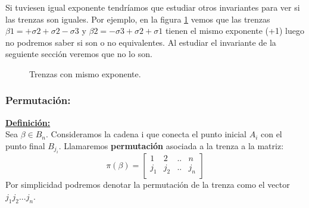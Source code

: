 \documentclass[14pt]{extarticle}
\begin{document}
Si tuviesen igual exponente tendríamos que estudiar otros invariantes para ver si las trenzas son iguales. Por ejemplo, en la figura \ref{exp3} vemos que las trenzas $\beta1 = +\sigma2+\sigma2-\sigma3$ y $\beta2 = -\sigma3+\sigma2+\sigma1$ tienen el mismo exponente (+1) luego no podremos saber si son o no equivalentes. Al estudiar el invariante de la seguiente sección veremos que no lo son.  \\
	\begin{figure}[h!]
		\centering
		\caption{Trenzas con mismo exponente.}
		\label{exp3} 
	\end{figure}

\bigskip
\subsubsection{Permutación:}\label{invtren2}
\textbf{\underline{Definición:}}\\
Sea $\beta \in B_{n}$. Consideramos la cadena i que conecta el punto inicial $ A_{i}$ con el punto final $B_{j_{i}}$. Llamaremos \textbf{permutación} asociada a la trenza a la matriz:\\
\[\pi(\beta)=\begin{bmatrix}
1 & 2 & .. & n\\
j_{1} & j_{2} & .. & j_{n} \\
\end{bmatrix}\]
Por simplicidad podremos denotar la permutación de la trenza como el vector $j_{1} j_{2} ... j_{n}$.\\
\end{document}
